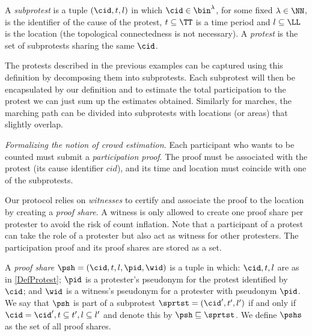 \begin{definition}\label{DefProtest}
  A \emph{subprotest} is a tuple \((\cid, t, l)\) in which \(\cid\in \bin^{\lambda}\), for some fixed \(\lambda\in \NN\), is the identifier of the cause of the protest, \(t \subseteq \TT\) is a time period and \(l \subseteq \LL\) is the location (the topological connectedness is not necessary).
  A \emph{protest} is the set of subprotests sharing the same \(\cid\).
\end{definition}

The protests described in the previous examples can be captured using this definition by decomposing them into subprotests.
Each subprotest will then be encapsulated by our definition and to estimate the total participation to the protest we can just sum up the estimates obtained.
Similarly for marches, the marching path can be divided into subprotests with locations (or areas) that slightly overlap.

\emph{Formalizing the notion of crowd estimation.} 
Each participant who wants to be counted must submit a \emph{participation proof}.
The proof must be associated with the protest (\ie its cause identifier \(cid\)), and its time and location must coincide with one of the subprotests.

Our protocol relies on \emph{witnesses} to certify and associate the proof to the location by creating a \emph{proof share}.
A witness is only allowed to create one proof share per protester to avoid the risk of count inflation.
Note that a participant of a protest can take the role of a protester but also act as witness for other protesters.
The participation proof and its proof shares are stored as a set.


\begin{definition}%
  \label{DefProofShare}\label{DefProofShares}
  A \emph{proof share} \(\psh = (\cid, t, l, \pid, \wid)\) is a tuple in which: 
  \(\cid, t, l\) are as in \cref{DefProtest};
  \(\pid\) is a protester's pseudonym for the protest identified by \(\cid\); and \(\wid\) is a witness's pseudonym for a protester with pseudonym \(\pid\).
  We say that \(\psh\) is part of a subprotest \(\sprtst = (\cid', t', l')\) if and only if \(\cid = \cid', t\subseteq t', l\subseteq l'\) and denote this by 
  \(\psh \sqsubseteq \sprtst\).
  We define \(\pshs\) as the set of all proof shares.
\end{definition}

